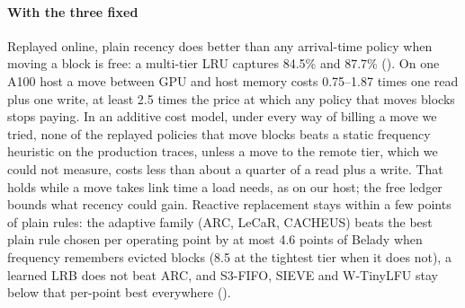 \paragraph{With the three fixed} Replayed online, plain recency does better than any arrival-time policy when
moving a block is free: a multi-tier LRU captures 84.5\% and 87.7\% (). On one A100 host a move
between GPU and host memory costs 0.75--1.87 times one read plus one write, at least 2.5 times the price at
which any policy that moves blocks stops paying. In an additive cost model, under every way of billing a move we
tried, none of the replayed policies that move blocks beats a static frequency heuristic on the production
traces, unless a move to the remote tier, which we could not measure, costs less than about a quarter of a read
plus a write. That holds while a move takes link time a load needs, as on our host; the free ledger bounds what
recency could gain. Reactive replacement stays within a few points of plain rules: the adaptive family (ARC,
LeCaR, CACHEUS) beats the best plain rule chosen per operating point by at most 4.6 points of Belady when
frequency remembers evicted blocks (8.5 at the tightest tier when it does not), a learned LRB does not beat ARC,
and S3-FIFO, SIEVE and W-TinyLFU stay below that per-point best everywhere ().

